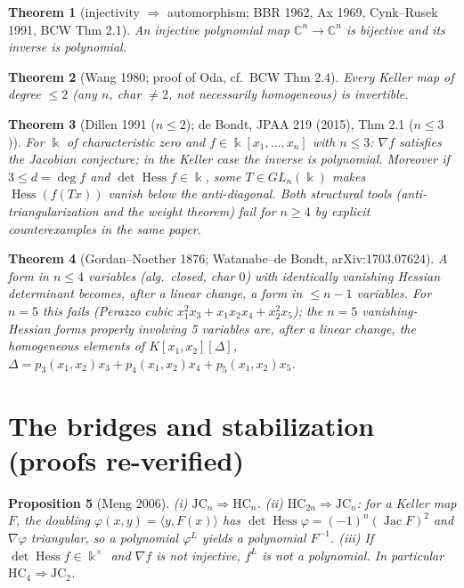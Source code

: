 \documentclass[11pt]{article}
\theoremstyle{plain}
\newtheorem{theorem}{Theorem}[section]
\newtheorem{proposition}[theorem]{Proposition}
\theoremstyle{definition}
\newcommand{\C}{\mathbb{C}}
\newcommand{\kk}{\Bbbk}
\newcommand{\Hess}{\operatorname{Hess}}
\newcommand{\Jac}{\operatorname{Jac}}
\newcommand{\JC}{\mathrm{JC}}
\newcommand{\HC}{\mathrm{HC}}
\begin{document}
\begin{theorem}[injectivity $\Rightarrow$ automorphism; BBR 1962, Ax 1969,
Cynk--Rusek 1991, BCW Thm 2.1]\label{thm:inj}
An injective polynomial map $\C^n\to\C^n$ is bijective and its inverse is
polynomial.
\end{theorem}

\begin{theorem}[Wang 1980; proof of Oda, cf.\ BCW Thm 2.4]\label{thm:wang}
Every Keller map of degree $\le2$ (any $n$, char $\ne2$, not necessarily
homogeneous) is invertible.
\end{theorem}

\begin{theorem}[Dillen 1991 ($n\le2$); de Bondt, JPAA 219 (2015), Thm 2.1
($n\le3$)]\label{thm:hc3}
For $\kk$ of characteristic zero and $f\in\kk[x_1,\dots,x_n]$ with $n\le3$:
$\nabla f$ satisfies the Jacobian conjecture; in the Keller case the inverse
is polynomial. Moreover if $3\le d=\deg f$ and $\det\Hess f\in\kk$, some
$T\in GL_n(\kk)$ makes $\Hess(f(Tx))$ vanish below the anti-diagonal.
Both structural tools (anti-triangularization and the weight theorem) fail
for $n\ge4$ by explicit counterexamples in the same paper.
\end{theorem}

\begin{theorem}[Gordan--Noether 1876; Watanabe--de Bondt, arXiv:1703.07624]
\label{thm:gn}
A form in $n\le4$ variables (alg.\ closed, char $0$) with identically
vanishing Hessian determinant becomes, after a linear change, a form in
$\le n-1$ variables. For $n=5$ this fails (Perazzo cubic
$x_1^2x_3+x_1x_2x_4+x_2^2x_5$); the $n=5$ vanishing-Hessian forms properly
involving 5 variables are, after a linear change, the homogeneous elements
of $K[x_1,x_2][\Delta]$, $\Delta=p_3(x_1,x_2)x_3+p_4(x_1,x_2)x_4+p_5(x_1,x_2)x_5$.
\end{theorem}

\section{The bridges and stabilization (proofs re-verified)}

\begin{proposition}[Meng 2006]\label{prop:bridges}
(i) $\JC_n\Rightarrow\HC_n$.
(ii) $\HC_{2n}\Rightarrow\JC_n$: for a Keller map $F$, the doubling
$\varphi(x,y)=\langle y,F(x)\rangle$ has
$\det\Hess\varphi=(-1)^n(\Jac F)^2$ and $\nabla\varphi$ triangular, so a
polynomial $\varphi^L$ yields a polynomial $F^{-1}$.
(iii) If $\det\Hess f\in\kk^\times$ and $\nabla f$ is not injective, $f^L$
is not a polynomial. In particular $\boxed{\HC_4\Rightarrow\JC_2}$.
\end{proposition}
\end{document}
